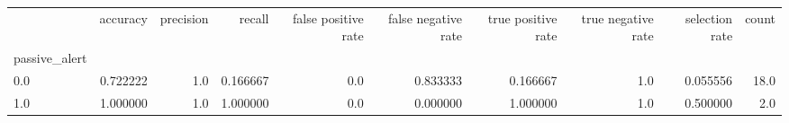 \begin{tabular}{lrrrrrrrrr}
\toprule
{} &  accuracy &  precision &    recall &  false positive rate &  false negative rate &  true positive rate &  true negative rate &  selection rate &  count \\
passive\_alert &           &            &           &                      &                      &                     &                     &                 &        \\
\midrule
0.0           &  0.722222 &        1.0 &  0.166667 &                  0.0 &             0.833333 &            0.166667 &                 1.0 &        0.055556 &   18.0 \\
1.0           &  1.000000 &        1.0 &  1.000000 &                  0.0 &             0.000000 &            1.000000 &                 1.0 &        0.500000 &    2.0 \\
\bottomrule
\end{tabular}
